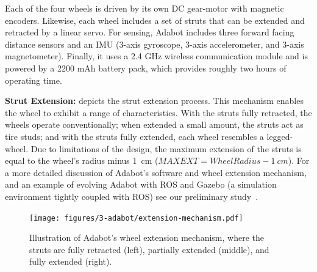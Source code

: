 
Each of the four wheels is driven by its own DC gear-motor with magnetic encoders.
%
Likewise, each wheel includes a set of struts that can be extended and retracted by a linear servo.
%
For sensing, Adabot includes three forward facing distance sensors and an IMU (3-axis gyroscope, 3-axis accelerometer, and 3-axis magnetometer).
%
Finally, it uses a 2.4 GHz wireless communication module and is powered by a 2200 mAh battery pack, which provides roughly two hours of operating time.


\noindent
\textbf{Strut Extension:}
%
 depicts the strut extension process.
%
This mechanism enables the wheel to exhibit a range of characteristics.
%
With the struts fully retracted, the wheels operate conventionally; when extended a small amount, the struts act as tire studs; and with the struts fully extended, each wheel resembles a legged-wheel.
%
%
Due to limitations of the design, the maximum extension of the struts is equal to the wheel's radius minus 1~\si{cm} ($\mathit{MAXEXT} = \mathit{WheelRadius} - 1~\si{cm}$).
%
For a more detailed discussion of Adabot's software and wheel extension mechanism, and an example of evolving Adabot with ROS and Gazebo (a simulation environment tightly coupled with ROS)
see our preliminary study~\citep{Clark.2017.SSCI.Adabot}.



\begin{figure}[!ht]
    \centering


    \texttt{[image: figures/3-adabot/extension-mechanism.pdf]}


    \caption{Illustration of Adabot's wheel extension mechanism, where the struts are fully retracted (left), partially extended (middle), and fully extended (right).}
    \label{fig:wheel-extender}


\end{figure}


